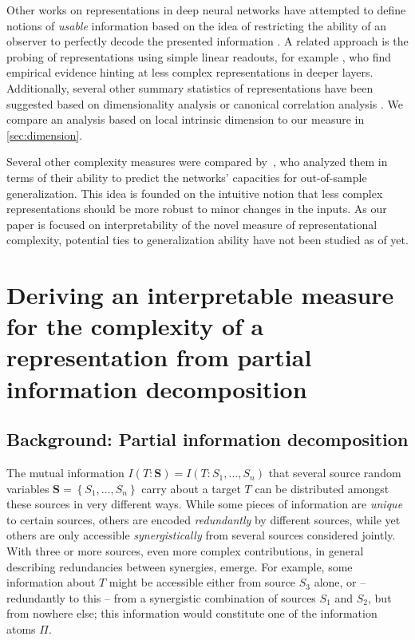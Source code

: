 \documentclass[10pt]{article}
\renewcommand\autoref[1]{\cref{#1}}
\theoremstyle{definition}
\theoremstyle{plain}
\begin{document}
Other works on representations in deep neural networks have attempted to define notions of \textit{usable} information based on the idea of restricting the ability of an observer to perfectly decode the presented information \citep{xu_theory_2020, kleinman_usable_2021}. A related approach is the probing of representations using simple linear readouts, for example \citet{alain_understanding_2018}, who find empirical evidence hinting at less complex representations in deeper layers. Additionally, several other summary statistics of representations have been suggested based on dimensionality analysis \citep{ansuini_intrinsic_2019, fukunaga1971algorithm} or canonical correlation analysis \citep{morcos_insights_2018, kornblith_similarity_2019}. We compare an analysis based on local intrinsic dimension to our measure in \autoref{sec:dimension}.

Several other complexity measures were compared by~\citet{jiang_fantastic_2019}, who analyzed them in terms of their ability to predict the networks' capacities for out-of-sample generalization. This idea is founded on the intuitive notion that less complex representations should be more robust to minor changes in the inputs. As our paper is focused on interpretability of the novel measure of representational complexity, potential ties to generalization ability have not been studied as of yet.

\section{Deriving an interpretable measure for the complexity of a representation from partial information decomposition}

\subsection{Background: Partial information decomposition}
\label{sec:pid}

The mutual information $I(T:\bm S) = I(T:S_1, \dots, S_n)$ that several source random variables $\bm{S} = \left\{S_1, \dots, S_n\right\}$ carry about a target $T$ can be distributed amongst these sources in very different ways. While some pieces of information are \textit{unique} to certain sources, others are encoded \textit{redundantly} by different sources, while yet others are only accessible \textit{synergistically} from several sources considered jointly. With three or more sources, even more complex contributions, in general describing redundancies between synergies, emerge. For example, some information about $T$ might be accessible either from source $S_3$ alone, or -- redundantly to this -- from a synergistic combination of sources $S_1$ and $S_2$, but from nowhere else; this information would constitute one of the information atoms $\Pi$.  
\end{document}
